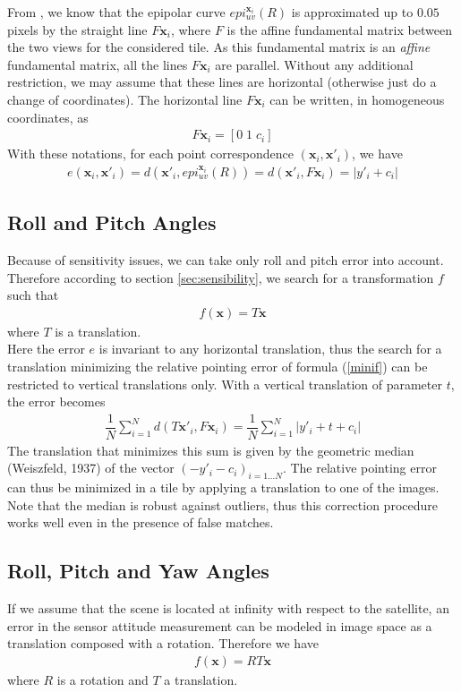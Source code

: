 \documentclass[paper=a4, fontsize=11pt]{article}
\begin{document}
From  \cite{de2014automatic}, we know that the epipolar curve $epi^{\textbf{x}_i}_{u v}(R)$ is approximated up to $0.05$ pixels by the straight line $F\textbf{x}_i$, where $F$ is
the affine fundamental matrix between the two views for the considered tile. As this fundamental matrix is an \textit{affine} fundamental matrix, all the lines $F\textbf{x}_i$ are parallel. Without any additional restriction, we may assume that these lines are horizontal (otherwise just do a change of coordinates). The horizontal line $F\textbf{x}_i$ can be written, in homogeneous coordinates, as
\begin{align*}
F\textbf{x}_i = \left[ 0 \; 1 \; c_i \right]
\end{align*}
With these notations, for each point correspondence $(\textbf{x}_i , \textbf{x}'_i)$, we have
\begin{align*}
e(\textbf{x}_i, \textbf{x}'_i) = d(\textbf{x}'_i, epi^{\textbf{x}_i}_{u v}(R)) = d(\textbf{x}'_i, F\textbf{x}_i) = | y'_i + c_i|
\end{align*}

\subsection{Roll and Pitch Angles}
Because of sensitivity issues, we can take only roll and pitch error into account. Therefore according to section \ref{sec:sensibility}, we search for a transformation $f$ such that
\begin{align*}
f(\textbf{x}) = T\textbf{x}
\end{align*}
where $T$ is a translation.\\
Here the error $e$ is invariant to any horizontal translation, thus the search for a translation minimizing the relative pointing error of formula (\ref{minif}) can be restricted to vertical translations only. With a vertical translation of parameter $t$, the error becomes
\begin{align*}
\dfrac{1}{N} \sum\limits_{i=1}^{N} d(T\textbf{x}'_i, F\textbf{x}_i) = \dfrac{1}{N} \sum\limits_{i=1}^{N} | y'_i + t+ c_i|
\end{align*}
The translation that minimizes this sum is given by the geometric median (Weiszfeld, 1937) of the vector $(-y'_i - c_i )_{i=1...N}$.  The relative pointing error can thus be minimized in a tile by applying a translation to one of the images. Note that the median is robust against outliers, thus this correction procedure works well even in the presence of false matches.

\subsection{Roll, Pitch and Yaw Angles}
If we assume that the scene is located at infinity with respect to the satellite, an error in the sensor attitude measurement can be modeled in image space as a translation composed with a rotation. Therefore we have
\begin{align*}
f(\textbf{x}) = RT\textbf{x}
\end{align*}
where $R$ is a rotation and $T$ a translation.\\



\end{document}
